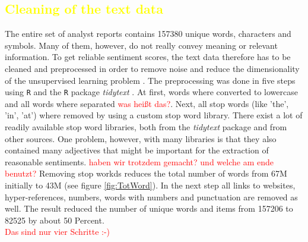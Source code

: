 \subsection{\textcolor{yellow}{Cleaning of the text data}}\label{cleaningText}
The entire set of analyst reports contains 157380 unique words, characters and symbols. Many of them, however, do not really convey meaning or relevant information. To get reliable sentiment scores, the text data therefore has to be cleaned and preprocessed in order to remove noise and reduce the dimensionality of the unsupervised learning problem \citep{HADDI201326}. The preprocessing was done in five steps using \texttt{R} \citep{Rproject} and the \texttt{R} package \textit{tidytext} \citep{tidytext}. At first, words where converted to lowercase and all words where separated \textcolor{red}{was heißt das?}. Next, all stop words (like 'the', 'in', 'at') where removed by using a custom stop word library. There exist a lot of readily available stop word libraries, both from the \textit{tidytext} package and from other sources. One problem, however, with many libraries is that they also contained many adjectives that might be important for the extraction of reasonable sentiments. \textcolor{red}{haben wir trotzdem gemacht? und welche am ende benutzt?} Removing stop workds reduces the total number of words from 67M initially to 43M (see figure \ref{fig:TotWord}). In the next step all links to websites, hyper-references, numbers, words with numbers and punctuation are removed as well. The result reduced the number of unique words and items from 157206 to 82525 by about 50 Percent. \\

\textcolor{red}{Das sind nur vier Schritte :-) }

